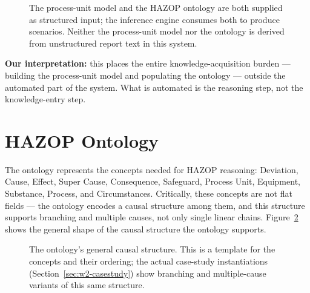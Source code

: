 \begin{figure}[htbp]
\centering
{}
\caption[System architecture of Single et al.\ (2020)]{The process-unit model and the HAZOP ontology are both supplied as structured input; the inference engine consumes both to produce scenarios. Neither the process-unit model nor the ontology is derived from unstructured report text in this system.}
\label{fig:w2-arch}
\end{figure}

\textbf{Our interpretation:} this places the entire knowledge-acquisition burden --- building the process-unit model and populating the ontology --- outside the automated part of the system. What is automated is the reasoning step, not the knowledge-entry step.

\section{HAZOP Ontology}
The ontology represents the concepts needed for HAZOP reasoning: Deviation, Cause, Effect, Super Cause, Consequence, Safeguard, Process Unit, Equipment, Substance, Process, and Circumstances. Critically, these concepts are not flat fields --- the ontology encodes a causal structure among them, and this structure supports branching and multiple causes, not only single linear chains. Figure~\ref{fig:w2-ontology-chain} shows the general shape of the causal structure the ontology supports.

\begin{figure}[htbp]
\centering
{}
\caption[General causal structure represented in the ontology]{The ontology's general causal structure. This is a template for the concepts and their ordering; the actual case-study instantiations (Section~\ref{sec:w2-casestudy}) show branching and multiple-cause variants of this same structure.}
\label{fig:w2-ontology-chain}
\end{figure}

